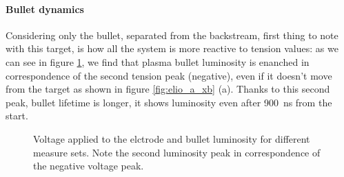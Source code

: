 \paragraph{Bullet dynamics}
Considering only the bullet, separated from the backstream, first thing to note with this target, is how all the system is more reactive to tension values: as we can see in figure \ref{fig:elio_a_Im}, we find that plasma bullet luminosity is enanched in correspondence of the second tension peak (negative), even if it doesn't move from the target as shown in figure \ref{fig:elio_a_xb} (a). Thanks to this second peak, bullet lifetime is longer, it shows luminosity even after \SI{900}{\nano\second} from the start.
\begin{figure}
 \centering
 \hfill
 \caption{Voltage applied to the elctrode and bullet luminosity for different measure sets. Note the second luminosity peak in correspondence of the negative voltage peak.}
 \label{fig:elio_a_Im}
\end{figure}


